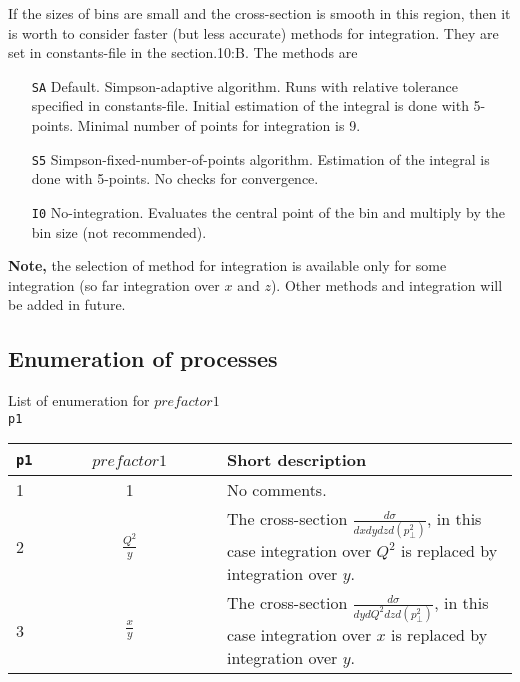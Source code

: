 \documentclass[prd,nofootinbib,eqsecnum,final]{revtex4}
\renewcommand{\(}{\left(}
\renewcommand{\)}{\right)}
\renewcommand{\[}{\left[}
\renewcommand{\]}{\right]}
\begin{document}
If the sizes of bins are small and the cross-section is smooth in this region, then it is worth to consider faster (but less accurate) methods for integration. They are set in constants-file in the section.10:B. The methods are
\begin{itemize}
\item[\texttt{SA}] Default. Simpson-adaptive algorithm. Runs with relative tolerance specified in constants-file. Initial estimation of the integral is done with 5-points. Minimal number of points for integration is 9.
\item[\texttt{S5}] Simpson-fixed-number-of-points algorithm. Estimation of the integral is done with 5-points. No checks for convergence.
\item[\texttt{I0}] No-integration. Evaluates the central point of the bin and multiply by the bin size (not recommended).
\end{itemize}

\textbf{Note,} the selection of method for integration is available only for some integration (so far integration over $x$ and $z$). Other methods and integration will be added in future.


\subsection{Enumeration of processes}

\begin{center}
List of enumeration for $prefactor1$
\\
\texttt{p1}
\\
\begin{tabular}{||l|c||p{12cm}||}
\hline\hline
\texttt{p1} & ~~$prefactor1$~~&  Short description 
\\\hline
1 & 1$\qquad\qquad\qquad\qquad\qquad$ & No comments.
\\\hline
2 & $\frac{Q^2}{y}$& The cross-section $\frac{d\sigma}{dx dy dz d(p_\perp^2)}$, in this case integration over $Q^2$ is replaced by integration over $y$.
\\\hline
3 & $\frac{x}{y}$ & The cross-section $\frac{d\sigma}{dy dQ^2 dz d(p_\perp^2)}$, in this case integration over $x$ is replaced by integration over $y$.
\\\hline\hline
\end{tabular}
\end{center}
\end{document}
